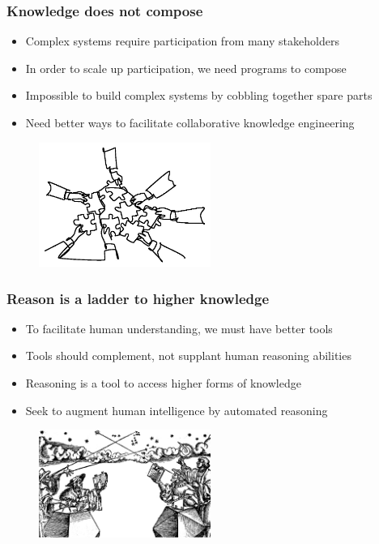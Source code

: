 \documentclass{beamer}
\begin{document}
  \begin{frame}
    \frametitle{Knowledge does not compose}
    \begin{itemize}
      \item Complex systems require participation from many stakeholders
      \item In order to scale up participation, we need programs to compose
      \item Impossible to build complex systems by cobbling together spare parts
      \item Need better ways to facilitate collaborative knowledge engineering
    \end{itemize}
    \begin{figure}[H]
      \centering
      \includegraphics[width=0.5\textwidth]{../clipart/compositionality.jpeg}
    \end{figure}
  \end{frame}

  \begin{frame}
    \frametitle{Reason is a ladder to higher knowledge}
    \begin{itemize}
      \item To facilitate human understanding, we must have better tools
      \item Tools should complement, not supplant human reasoning abilities
      \item Reasoning is a tool to access higher forms of knowledge
      \item Seek to augment human intelligence by automated reasoning
    \end{itemize}
    \begin{figure}[H]
      \centering
      \includegraphics[width=0.5\textwidth]{../clipart/astronomers.png}
    \end{figure}
  \end{frame}
\end{document}
